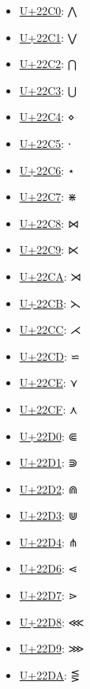 \begin{itemize}
	\item \href{https://decodeunicode.org/en/u+22C0}{U+22C0}: ⋀
	\item \href{https://decodeunicode.org/en/u+22C1}{U+22C1}: ⋁
	\item \href{https://decodeunicode.org/en/u+22C2}{U+22C2}: ⋂
	\item \href{https://decodeunicode.org/en/u+22C3}{U+22C3}: ⋃
	\item \href{https://decodeunicode.org/en/u+22C4}{U+22C4}: ⋄
	\item \href{https://decodeunicode.org/en/u+22C5}{U+22C5}: ⋅
	\item \href{https://decodeunicode.org/en/u+22C6}{U+22C6}: ⋆
	\item \href{https://decodeunicode.org/en/u+22C7}{U+22C7}: ⋇
	\item \href{https://decodeunicode.org/en/u+22C8}{U+22C8}: ⋈
	\item \href{https://decodeunicode.org/en/u+22C9}{U+22C9}: ⋉
	\item \href{https://decodeunicode.org/en/u+22CA}{U+22CA}: ⋊
	\item \href{https://decodeunicode.org/en/u+22CB}{U+22CB}: ⋋
	\item \href{https://decodeunicode.org/en/u+22CC}{U+22CC}: ⋌
	\item \href{https://decodeunicode.org/en/u+22CD}{U+22CD}: ⋍
	\item \href{https://decodeunicode.org/en/u+22CE}{U+22CE}: ⋎
	\item \href{https://decodeunicode.org/en/u+22CF}{U+22CF}: ⋏
	\item \href{https://decodeunicode.org/en/u+22D0}{U+22D0}: ⋐
	\item \href{https://decodeunicode.org/en/u+22D1}{U+22D1}: ⋑
	\item \href{https://decodeunicode.org/en/u+22D2}{U+22D2}: ⋒
	\item \href{https://decodeunicode.org/en/u+22D3}{U+22D3}: ⋓
	\item \href{https://decodeunicode.org/en/u+22D4}{U+22D4}: ⋔
	\item \href{https://decodeunicode.org/en/u+22D6}{U+22D6}: ⋖
	\item \href{https://decodeunicode.org/en/u+22D7}{U+22D7}: ⋗
	\item \href{https://decodeunicode.org/en/u+22D8}{U+22D8}: ⋘
	\item \href{https://decodeunicode.org/en/u+22D9}{U+22D9}: ⋙
	\item \href{https://decodeunicode.org/en/u+22DA}{U+22DA}: ⋚

\end{itemize}
